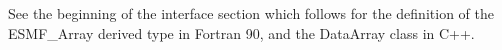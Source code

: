 

See the beginning of the interface section which
follows for the definition of the ESMF\_Array derived type
in Fortran 90, and the DataArray class in C++.


